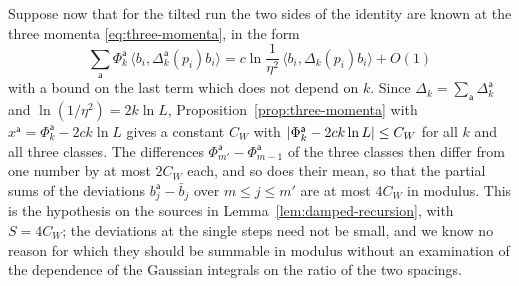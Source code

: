 \documentclass[11pt]{preprint}
\DeclarePairedDelimiter{\abs}{\lvert}{\rvert}
\numberwithin{equation}{section}
\theoremstyle{definition}
\theoremstyle{remark}
\theoremstyle{plain}
\begin{document}
Suppose now that for the tilted run the two sides of the identity are known at the three momenta \eqref{eq:three-momenta}, in the form
\begin{equation}\label{eq:three-window-identity}
    \sum_{\mathsf a}\Phi^{\mathsf a}_k\,\langle b_i, \Delta^{\mathsf a}_k(p_i)b_i\rangle = c\ln\frac{1}{\eta^2}\,\langle b_i, \Delta_k(p_i)b_i\rangle + O(1)
\end{equation}
with a bound on the last term which does not depend on $k$. Since $\Delta_k = \sum_{\mathsf a}\Delta^{\mathsf a}_k$ and $\ln(1/\eta^2) = 2k\ln L$, Proposition~\ref{prop:three-momenta} with $x^{\mathsf a} = \Phi^{\mathsf a}_k - 2ck\ln L$ gives a constant $C_W$ with $\abs{\Phi^{\mathsf a}_k - 2ck\ln L} \leq C_W$ for all $k$ and all three classes. The differences $\Phi^{\mathsf a}_{m'} - \Phi^{\mathsf a}_{m-1}$ of the three classes then differ from one number by at most $2C_W$ each, and so does their mean, so that the partial sums of the deviations $b^{\mathsf a}_j - \bar b_j$ over $m \leq j \leq m'$ are at most $4C_W$ in modulus. This is the hypothesis on the sources in Lemma~\ref{lem:damped-recursion}, with $S = 4C_W$; the deviations at the single steps need not be small, and we know no reason for which they should be summable in modulus without an examination of the dependence of the Gaussian integrals on the ratio of the two spacings.
\end{document}
